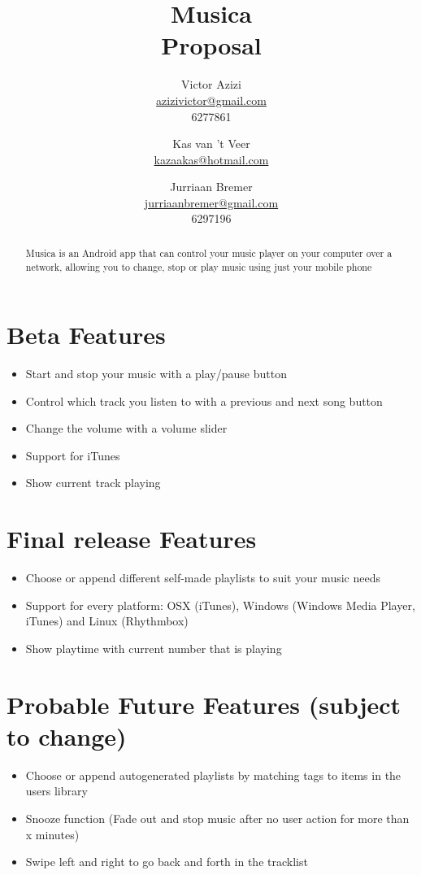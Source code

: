\documentclass[a4paper, 13pt]{article}
\title{Musica \\ Proposal }
\author{Victor Azizi \\ \url{azizivictor@gmail.com} \\ 6277861 \and
        Kas van 't Veer \\ \url{kazaakas@hotmail.com} \\          \and
        Jurriaan Bremer \\ \url{jurriaanbremer@gmail.com} \\ 6297196
}
\begin{document}
\maketitle
\clearpage

\clearpage
\renewcommand{\abstractname}{Abstract}
\begin{abstract}
  Musica is an Android app that can control your music player on your computer
  over a network, allowing you to change, stop or play music using just your
  mobile phone
\end{abstract}

\section*{Beta Features}
    \begin{itemize}
     \item Start and stop your music with a play/pause button
     \item Control which track you listen to with a previous and next song button
     \item Change the volume with a volume slider 
     \item Support for iTunes
     \item Show current track playing
    \end{itemize}

\section*{Final release Features}
    \begin{itemize}
     \item Choose or append different self-made playlists to suit your music needs
     \item Support for every platform: OSX (iTunes), Windows (Windows Media
     Player, iTunes) and Linux (Rhythmbox)
     \item Show playtime with current number that is playing
    \end{itemize}

\section*{Probable Future Features (subject to change)}
    \begin{itemize}
     \item Choose or append autogenerated playlists by matching tags to items in the users library
     \item Snooze function (Fade out and stop music after no user action for more than x minutes)
     \item Swipe left and right to go back and forth in the tracklist
    \end{itemize}
\end{document}
